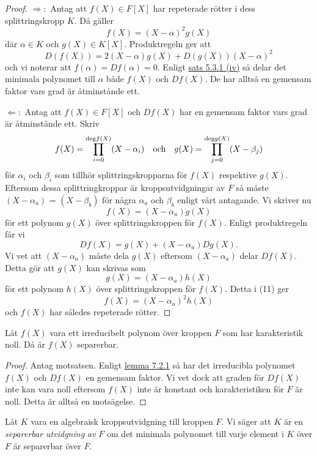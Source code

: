 \documentclass{article}
\newcommand{\grad}[0]{\textnormal{deg}}
\theoremstyle{definition}
\begin{document}
\begin{proof}
  $\Rightarrow:$ Antag att $f(X) \in F[X]$ har repeterade rötter i dess splittringskropp $K$. Då gäller 
  \[f(X) = (X-\alpha)^2 g(X)\]
  där $\alpha \in K$ och $g(X) \in K[X].$ Produktregeln ger att 
  \[D(f(X)) = 2(X- \alpha) g(X) + D(g(X)) (X - \alpha)^2\]
  och vi noterar att $f(\alpha) = Df(\alpha) = 0.$ Enligt \hyperlink{minpol}{sats 5.3.1 (iv)} så delar det minimala polynomet till $\alpha$ både 
  $f(X)$ och $Df(X)$. De har alltså en gemensam faktor vars grad är åtminstånde ett. 

  $\Leftarrow:$ Antag att $f(X) \in F[X]$ och $Df(X)$ har en gemensam faktor vars grad är åtminstånde ett. 
  Skriv 
  \[f(X) = \prod_{i = 0}^{\grad f(X)} (X-\alpha_i) \quad \textnormal{och} \quad g(X) = \prod_{j = 0}^{\grad g(X)} (X-\beta_j)\]
  för $\alpha_i$ och $\beta_i$ som tillhör splittringskropparna för $f(X)$ respektive $g(X)$. Eftersom dessa 
  splittringkroppar är kroppsutvidgningar av $F$ så måste $(X - \alpha_a)$ = $(X - \beta_b)$ för några $\alpha_a$ och $\beta_b$ enligt vårt antagande. 
  Vi skriver nu 
  \begin{equation}
    f(X) = (X-\alpha_a)g(X)
  \end{equation}
  för ett polynom $g(X)$ över splittringskroppen för $f(X)$. Enligt produktregeln får vi 
  \[Df(X) = g(X) + (X - \alpha_a)Dg(X).\]
  Vi vet att $(X - \alpha_a)$ måste dela $g(X)$ eftersom $(X - \alpha_a)$ delar $Df(X)$. Detta gör att $g(X)$ kan skrivas som
  \[g(X) = (X - \alpha_a)h(X)\]
  för ett polynom $h(X)$ över splittringskroppen för $f(X)$. Detta i (11) ger 
  \[f(X) = (X - \alpha_a)^2h(X)\]
  och $f(X)$ har således repeterade rötter.
\end{proof}

\hypertarget{irrsep}{}
\begin{myprop}{}{}
  Låt $f(X)$ vara ett irreducibelt polynom över kroppen $F$ som har karakteristik noll. Då är $f(X)$ separerbar. 
\end{myprop}

\begin{proof}
  Antag motsatsen. Enligt \hyperlink{lemma7.2.1}{lemma 7.2.1} så har det irreducibla polynomet $f(X)$ och $Df(X)$ en gemensam faktor. 
  Vi vet dock att graden för $Df(X)$ inte kan vara noll eftersom $f(X)$ inte är konstant och karakteristiken för $F$ är noll. Detta är alltså 
  en motsägelse.
\end{proof}

\begin{mydef}{}{}
  Låt $K$ vara en algebraisk kroppsutvidgning till kroppen $F$. Vi säger att $K$ är en \textit{separerbar utvidgning av} $F$ om 
  det minimala polynomet till varje element i $K$ över $F$ är separerbar över $F$. 
\end{mydef}
\end{document}
